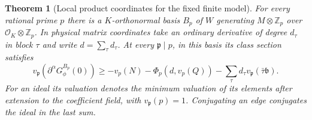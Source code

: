 \documentclass[a4paper,11pt]{article}
\newtheorem{theorem}[proposition]{Theorem}
\theoremstyle{definition}
\theoremstyle{remark}
\newcommand{\ZZ}{\mathbb Z}\newcommand{\ord}{\operatorname{ord}}
\numberwithin{equation}{section}
\newcommand{\OO}{\mathcal O}
\begin{document}
\begin{theorem}[Local product coordinates for the fixed finite model]\leavevmode
\label{thm:adapted314}
For every rational prime \(p\) there is a \(K\)-orthonormal basis
\(B_p\) of \(W\) generating \(M\otimes\ZZ_p\) over
\(\OO_K\otimes\ZZ_p\). In physical matrix coordinates take an
ordinary derivative of degree \(d_\tau\) in block \(\tau\) and
write \(d=\sum_\tau d_\tau\). At every \(\mathfrak p\mid p\),
in this basis its class section satisfies
\[
 v_{\mathfrak p}(\partial^\alpha G^{B_p}_\phi(0))
 \ge -v_p(N)-\Phi_p(d,v_p(Q))
           -\sum_\tau d_\tau v_{\mathfrak p}(\bar\tau\mathfrak b).
\]
For an ideal its valuation denotes the minimum valuation of
its elements after extension to the coefficient field, with
\(v_{\mathfrak p}(p)=1\). Conjugating an edge conjugates the
ideal in the last sum.
\end{theorem}
\end{document}
